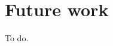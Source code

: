\documentclass[../main.tex]{subfiles}
\begin{document}
\section{Future work}

To do.
\end{document}

